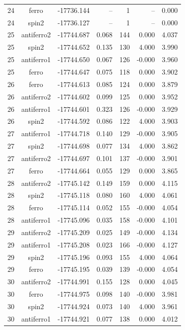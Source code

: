 \begin{longtable}{@{}ccrrrrr@{}}
24 & ferro & -17736.144 & -- & 1 & -- & 0.000 \\
24 & spin2 & -17736.127 & -- & 1 & -- & 0.000 \\
\rowcolor{gray!20} 25 & antiferro2 & -17744.687 & 0.068 & 144 & 0.000 & 4.037 \\
25 & spin2 & -17744.652 & 0.135 & 130 & 4.000 & 3.990 \\
25 & antiferro1 & -17744.650 & 0.067 & 126 & -0.000 & 3.960 \\
25 & ferro & -17744.647 & 0.075 & 118 & 0.000 & 3.902 \\
\rowcolor{gray!20} 26 & ferro & -17744.613 & 0.085 & 124 & 0.000 & 3.879 \\
26 & antiferro2 & -17744.602 & 0.099 & 125 & 0.000 & 3.952 \\
26 & antiferro1 & -17744.601 & 0.323 & 126 & -0.000 & 3.929 \\
26 & spin2 & -17744.592 & 0.086 & 122 & 4.000 & 3.903 \\
\rowcolor{gray!20} 27 & antiferro1 & -17744.718 & 0.140 & 129 & -0.000 & 3.905 \\
27 & spin2 & -17744.698 & 0.077 & 134 & 4.000 & 3.862 \\
27 & antiferro2 & -17744.697 & 0.101 & 137 & -0.000 & 3.901 \\
27 & ferro & -17744.664 & 0.055 & 129 & 0.000 & 3.865 \\
\rowcolor{gray!20} 28 & antiferro2 & -17745.142 & 0.149 & 159 & 0.000 & 4.115 \\
28 & spin2 & -17745.118 & 0.080 & 160 & 4.000 & 4.061 \\
28 & ferro & -17745.114 & 0.052 & 155 & -0.000 & 4.054 \\
28 & antiferro1 & -17745.096 & 0.035 & 158 & -0.000 & 4.101 \\
\rowcolor{gray!20} 29 & antiferro2 & -17745.209 & 0.025 & 149 & -0.000 & 4.134 \\
29 & antiferro1 & -17745.208 & 0.023 & 166 & -0.000 & 4.127 \\
29 & spin2 & -17745.196 & 0.093 & 155 & 4.000 & 4.064 \\
29 & ferro & -17745.195 & 0.039 & 139 & -0.000 & 4.054 \\
\rowcolor{gray!20} 30 & antiferro2 & -17744.991 & 0.155 & 128 & 0.000 & 4.045 \\
30 & ferro & -17744.975 & 0.098 & 140 & -0.000 & 3.981 \\
30 & spin2 & -17744.924 & 0.073 & 140 & 4.000 & 3.961 \\
30 & antiferro1 & -17744.921 & 0.077 & 138 & 0.000 & 4.012 \\

\end{longtable}
